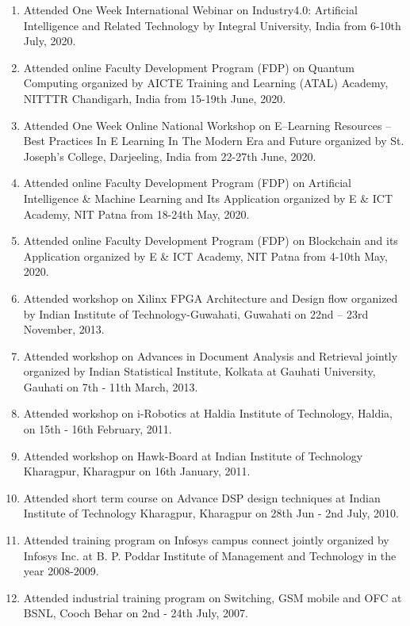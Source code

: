 \documentclass[11pt,a4paper]{moderncv}
\begin{document}
\begin{adjustwidth}{6em}{0pt}
\begin{enumerate}
		\item Attended One Week International Webinar on Industry4.0: Artificial Intelligence and Related Technology by Integral University, India from 6-10th July, 2020.
		
		\item Attended online Faculty Development Program (FDP) on Quantum Computing organized by AICTE Training and Learning (ATAL) Academy, NITTTR Chandigarh, India from 15-19th June, 2020.
		
		\item Attended One Week Online National Workshop on E–Learning Resources – Best Practices In E Learning In The Modern Era and Future organized by St. Joseph’s College, Darjeeling, India from 22-27th June, 2020.
		
		\item Attended online Faculty Development Program (FDP) on Artificial Intelligence \& Machine Learning and Its Application organized by E \& ICT Academy, NIT Patna from 18-24th May, 2020.
		
		\item Attended online Faculty Development Program (FDP) on Blockchain and its Application organized by E \& ICT Academy, NIT Patna from 4-10th May, 2020.
		
		\item Attended workshop on Xilinx FPGA Architecture and Design flow organized by Indian Institute of Technology-Guwahati, Guwahati on 22nd – 23rd November, 2013.
		
		\item Attended workshop on Advances in Document Analysis and Retrieval jointly organized by Indian Statistical Institute, Kolkata at Gauhati University, Gauhati on 7th - 11th March, 2013.
		
		\item Attended workshop on i-Robotics at Haldia Institute of Technology, Haldia, on 15th - 16th February, 2011.
		
		\item Attended workshop on Hawk-Board at Indian Institute of Technology Kharagpur, Kharagpur on 16th January, 2011.
		
		\item Attended short term course on Advance DSP design techniques at Indian Institute of Technology Kharagpur, Kharagpur on 28th Jun - 2nd July, 2010.
		
		\item Attended training program on Infosys campus connect jointly organized by Infosys Inc. at B. P. Poddar Institute of Management and Technology in the year 2008-2009.
		
		\item Attended industrial training program on Switching, GSM mobile and OFC at BSNL, Cooch Behar on 2nd - 24th July, 2007.
		
	\end{enumerate}
\end{adjustwidth}
\end{document}
